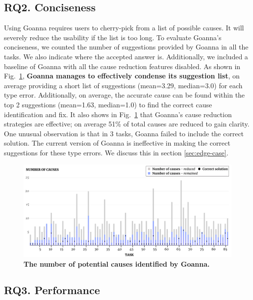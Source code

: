  	\subsection{RQ2. Conciseness}\label{sub:eval-conciseness}
 Using Goanna requires users to cherry-pick from a list of possible causes. It will severely reduce the usability if the list is too long. To evaluate Goanna's conciseness, we counted the number of suggestions provided by Goanna in all the tasks.  We also indicate where the accepted answer is. Additionally, we included a baseline of Goanna with all the cause reduction features disabled. As shown in Fig.~\ref{fig:conciseness}, \textbf{Goanna manages to effectively condense its suggestion list}, on average providing a short list of suggestions (mean=3.29, median=3.0) for each type error. Additionally, on average, the accurate cause can be found within the top 2 suggestions (mean=1.63, median=1.0) to find the correct cause identification and fix. It also shows in Fig.~\ref{fig:conciseness} that Goanna's cause reduction strategies are effective; on average 51\% of total causes are reduced to gain clarity. One unusual observation is that in 3 tasks, Goanna failed to include the correct solution. The current version of Goanna is ineffective in making the correct suggestions for these type errors. We discuss this in section \ref{sec:edge-case}. 
 
    \begin{figure}[htb!]
        \centering
        \includegraphics[width=\linewidth]{images/Conciseness}
        \caption{\textbf{The number of potential causes identified by Goanna.} }
        \label{fig:conciseness}
    \end{figure}



    \subsection{RQ3. Performance} \label{sub:eval-performacne}

